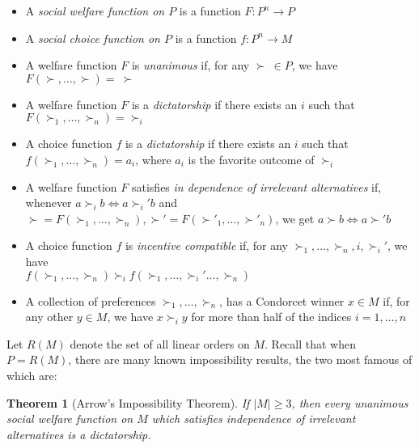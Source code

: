 \documentclass[12pt]{article}
\newtheorem{theorem}{Theorem}
\newcommand{\1}[1]{\mathds{1}[{#1}]}
\begin{document}
    \begin{itemize}
      \item A \emph{social welfare function on $P$}
        is a function $F : P^n \to P$
      \item A \emph{social choice function on $P$}
        is a function $f : P^n \to M$
      \item A welfare function $F$ is \emph{unanimous} if,
        for any $\succ\ \in P$, we have $F(\succ,\ldots,\succ) =\ \succ$
      \item A welfare function $F$ is a \emph{dictatorship} if
        there exists an $i$ such that $F(\succ_1,\ldots,\succ_n) = \succ_i$
      \item A choice function $f$ is a \emph{dictatorship} if
        there exists an $i$ such that $f(\succ_1,\ldots,\succ_n) = a_i$,
        where $a_i$ is the favorite outcome of $\succ_i$
      \item A welfare function $F$ satisfies \emph{in dependence of
        irrelevant alternatives} if, whenever $a\succ_i b \iff a\succ_i' b$
        and $\succ = F(\succ_1,\ldots,\succ_n),
        \succ' = F(\succ'_1,\ldots,\succ'_n)$,
        we get $a\succ b \iff a\succ' b$
      \item A choice function $f$ is \emph{incentive compatible} if,
        for any $\succ_1,\ldots,\succ_n, i, \succ_i'$, we have \\
        $f(\succ_1,\ldots,\succ_n) \succ_i f(\succ_1,\ldots,\succ_i'\ldots,\succ_n)$
      \item A collection of preferences $\succ_1,\ldots,\succ_n$,
        has a Condorcet winner $x \in M$ if, for any other $y\in M$,
        we have $x \succ_i y$ for more than half of the indices
        $i=1,\ldots,n$
    \end{itemize}

    Let $R(M)$ denote the set of all linear orders on $M$.
    Recall that when $P = R(M)$, there are many known impossibility results,
    the two most famous of which are:

    \begin{theorem}[Arrow's Impossibility Theorem]
      If $|M| \ge 3$, then
      every unanimous social welfare function on $M$ which satisfies independence of
      irrelevant alternatives is a dictatorship.
    \end{theorem}
\end{document}
